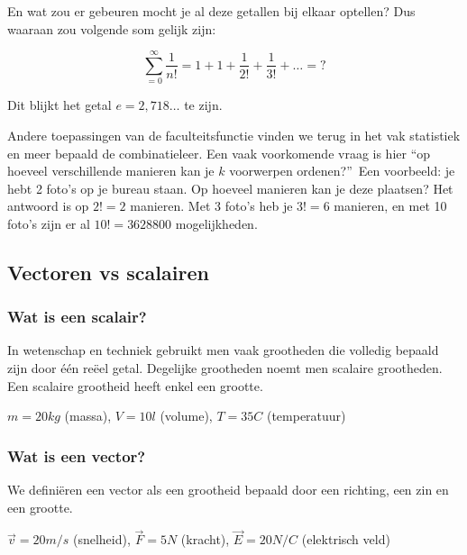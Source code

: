En wat zou er gebeuren mocht je al deze getallen bij elkaar optellen? Dus waaraan zou volgende som gelijk zijn:

\begin{equation*}
\sum_{=0}^{\infty} \frac{1}{n!} = 1+1+\frac{1}{2!}+\frac{1}{3!}+\ldots=?
\end{equation*}

Dit blijkt het getal $e=2,718\ldots$ te zijn.

Andere toepassingen van de faculteitsfunctie vinden we terug in het vak statistiek en meer bepaald de combinatieleer. Een vaak voorkomende vraag is hier \textquotedblleft op hoeveel verschillende manieren kan je $k$ voorwerpen ordenen?\textquotedblright \  Een voorbeeld: je hebt 2 foto's op je bureau staan. Op hoeveel manieren kan je deze plaatsen? Het antwoord is op $2!=2$ manieren. Met 3 foto's heb je $3!=6$ manieren, en met 10 foto's zijn er al $10!=3628800$ mogelijkheden.

\subsection{Vectoren vs scalairen}
\subsubsection{Wat is een scalair?}
In wetenschap en techniek gebruikt men vaak grootheden die volledig bepaald zijn door \'e\'en re\"eel getal. Degelijke grootheden noemt men scalaire grootheden. Een scalaire grootheid heeft enkel een grootte.

\begin{voorbeeld}
$m=20kg$ (massa), $V=10l$ (volume), $T=35$\textdegree$C$ (temperatuur)
\end{voorbeeld}

\subsubsection{Wat is een vector?}

\begin{definitie}
	We defini\"eren een vector als een grootheid bepaald door een richting, een zin en een grootte.
\end{definitie}

\begin{voorbeeld}
	$\vec{v}=20 m/s$ (snelheid), $\vec{F}=5N$ (kracht), $\vec{E}=20 N/C$ (elektrisch veld)
\end{voorbeeld}

